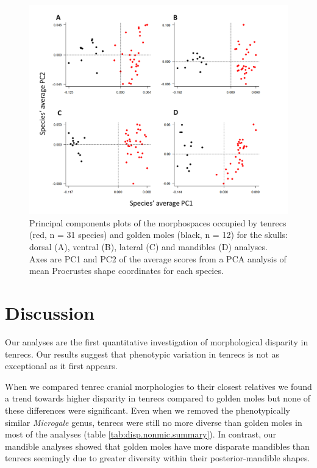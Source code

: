 \documentclass[12pt,a4paper]{article}
\begin{document}
	\begin{figure}[H]
	\centering
	\includegraphics[width=1\linewidth]{figures/FourPlotPCA.png}
	\caption[Principal components plots of the morphospaces occupied by tenrecs and golden moles]
		{Principal components plots of the morphospaces occupied by tenrecs (red, n = 31 species) and golden moles (black, n = 12) for the skulls: dorsal (A), ventral (B), lateral (C) and mandibles (D) analyses. Axes are PC1 and PC2 of the average scores from a PCA analysis of mean Procrustes shape coordinates for each species. }
	\label{fig:fourPCA}
	\end{figure}


\section{Discussion} 


	Our analyses are the first quantitative investigation of morphological disparity in tenrecs. Our results suggest that phenotypic variation in tenrecs is not as exceptional as it first appears.
	 
	When we compared tenrec cranial morphologies to their closest relatives we found a trend towards higher disparity in tenrecs compared to golden moles but none of these differences were significant. Even when we removed the phenotypically similar \textit{Microgale} genus, tenrecs were still no more diverse than golden moles in most of the analyses (table \ref{tab:disp.nonmic.summary}). In contrast, our mandible analyses showed that golden moles have more disparate mandibles than tenrecs seemingly due to greater diversity within their posterior-mandible shapes.
\end{document}
